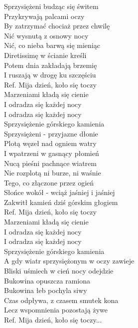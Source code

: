 
\begin{flushleft}
Sprzysiężeni budząc się świtem  \\
Przykrywają palcami oczy \tab{}\\
By zatrzymać chociaż przez chwilę  \\
Nić wysnutą z osnowy nocy \tab{} \\
Nić, co nieba barwą się mieniąc \\
Diretissimę w ścianie kreśli \tab{} \\
Potem dnia zakładają brzemię \tab{} \\
I ruszają w drogę ku szczęściu \tab{}\\
\vskip 3mm
Ref. Mija dzień, koło się toczy \tab{}\\
\hspace{0.9cm}Marzeniami kładą się cienie \\
\hspace{0.9cm}I odradza się każdej nocy \tab{} \\
\hspace{0.9cm}I odradza się każdej nocy \tab{}\\
\hspace{0.9cm}Sprzysiężenie górskiego kamienia  \\
\vskip 3mm
Sprzysiężeni - przyjazne dłonie \\
Plotą węzeł nad ogniem watry \\
I wpatrzeni w gasnący płomień \\
Nucą pieśni pachnące wiatrem \\
Nie rozplotą ni burze, ni waśnie \\
Tego, co złączone przez ogień \\
Słońce wokół - wciąż jaśniej i jaśniej \\
Zakwitł kamień dziś górskim głogiem \\
\vskip 3mm
Ref. Mija dzień, koło się toczy\\
\hspace{0.9cm}Marzeniami kładą się cienie \\
\hspace{0.9cm}I odradza się każdej nocy \\
\hspace{0.9cm}I odradza się każdej nocy \\
\hspace{0.9cm}Sprzysiężenie górskiego kamienia \\
\vskip 3mm
A gdy wiatr sprzysiężonym w oczy zawieje \\
Bliski uśmiech w cień nocy odejdzie \\
Bukowina opuszcza ramiona \\
Bukowina łeb pochyla siwy \\
Czas odpływa, z czasem smutek kona \\
Lecz wspomnienia pozostają żywe \\
\vskip 3mm
Ref. Mija dzień, koło się toczy...
\end{flushleft}
\clearpage
